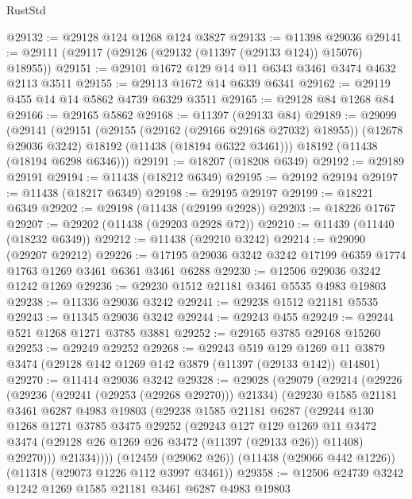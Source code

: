 \begin{lexlean}{RustStd}
\begin{coremodule}
@29132 := @29128 @124 @1268 @124 @3827
@29133 := @11398 @29036
@29141 := @29111 (@29117 (@29126 (@29132 (@11397 (@29133 @124)) @15076) @18955))
@29151 := @29101 @1672 @129 @14 @11 @6343 @3461 @3474 @4632 @2113 @3511
@29155 := @29113 @1672 @14 @6339 @6341
@29162 := @29119 @455 @14 @14 @5862 @4739 @6329 @3511
@29165 := @29128 @84 @1268 @84
@29166 := @29165 @5862
@29168 := @11397 (@29133 @84)
@29189 := @29099
    (@29141
      (@29151
        (@29155 (@29162 (@29166 @29168 @27032) @18955))
        (@12678 @29036 @3242)
        @18192
        (@11438 (@18194 @6322 @3461)))
      @18192
      (@11438 (@18194 @6298 @6346)))
@29191 := @18207 (@18208 @6349)
@29192 := @29189 @29191
@29194 := @11438 (@18212 @6349)
@29195 := @29192 @29194
@29197 := @11438 (@18217 @6349)
@29198 := @29195 @29197
@29199 := @18221 @6349
@29202 := @29198 (@11438 (@29199 @2928))
@29203 := @18226 @1767
@29207 := @29202 (@11438 (@29203 @2928 @72))
@29210 := @11439 (@11440 (@18232 @6349))
@29212 := @11438 (@29210 @3242)
@29214 := @29090 (@29207 @29212)
@29226 := @17195 @29036 @3242 @3242 @17199 @6359 @1774 @1763 @1269 @3461 @6361 @3461 @6288
@29230 := @12506 @29036 @3242 @1242 @1269
@29236 := @29230 @1512 @21181 @3461 @5535 @4983 @19803
@29238 := @11336 @29036 @3242
@29241 := @29238 @1512 @21181 @5535
@29243 := @11345 @29036 @3242
@29244 := @29243 @455
@29249 := @29244 @521 @1268 @1271 @3785 @3881
@29252 := @29165 @3785 @29168 @15260
@29253 := @29249 @29252
@29268 := @29243
    @519
    @129
    @1269
    @11
    @3879
    @3474
    (@29128 @142 @1269 @142 @3879 (@11397 (@29133 @142)) @14801)
@29270 := @11414 @29036 @3242
@29328 := @29028
    (@29079
      (@29214
        (@29226
          (@29236 (@29241 (@29253 (@29268 @29270))) @21334)
          (@29230
            @1585
            @21181
            @3461
            @6287
            @4983
            @19803
            (@29238
              @1585
              @21181
              @6287
              (@29244
                @130
                @1268
                @1271
                @3785
                @3475
                @29252
                (@29243
                  @127
                  @129
                  @1269
                  @11
                  @3472
                  @3474
                  (@29128 @26 @1269 @26 @3472 (@11397 (@29133 @26)) @11408)
                  @29270)))
            @21334))))
    (@12459 (@29062 @26))
    (@11438 (@29066 @442 @1226))
    (@11318 (@29073 @1226 @112 @3997 @3461))
@29358 := @12506
    @24739
    @3242
    @1242
    @1269
    @1585
    @21181
    @3461
    @6287
    @4983
    @19803

\end{coremodule}
\end{lexlean}
